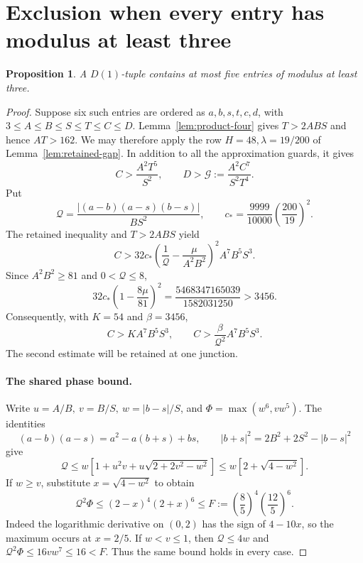 \documentclass[12pt]{article}
\newtheorem{proposition}[theorem]{Proposition}
\numberwithin{equation}{section}
\begin{document}
\section{Exclusion when every entry has modulus at least three}
\label{sec:all-large}

\begin{proposition}\label{prop:no-all-large-six}
A \(D(1)\)-tuple contains at most five entries of modulus at least three.
\end{proposition}
\begin{proof}
Suppose six such entries are ordered as \(a,b,s,t,c,d\), with
\(3\le A\le B\le S\le T\le C\le D\).
Lemma~\ref{lem:product-four} gives \(T>2ABS\) and hence \(AT>162\).
We may therefore apply the row \(H=48,\lambda=19/200\) of
Lemma~\ref{lem:retained-gap}. In addition to all the approximation guards,
it gives
\begin{equation}\label{eq:integrated-6}
C>\frac{A^2T^5}{S^2},\qquad
 D>\mathcal G:=\frac{A^2C^7}{S^2T^4}.
\end{equation}
Put
\[
 \mathcal Q=\frac{|(a-b)(a-s)(b-s)|}{BS^2},\qquad
 c_*=\frac{9999}{10000}\left(\frac{200}{19}\right)^2.
\]
The retained inequality and \(T>2ABS\) yield
\[
 C>32c_*\left(\frac1{\mathcal Q}-\frac{\mu}{A^2B^2}\right)^2
                         A^7B^5S^3.
\]
Since \(A^2B^2\ge81\) and \(0<\mathcal Q\le8\),
\[
 32c_*\left(1-\frac{8\mu}{81}\right)^2
 =\frac{5468347165039}{1582031250}>3456.
\]
Consequently, with \(K=54\) and \(\beta=3456\),
\begin{equation}\label{eq:large-gap}
 C>K A^7B^5S^3,\qquad
 C>\frac{\beta}{\mathcal Q^2}A^7B^5S^3.
\end{equation}
The second estimate will be retained at one junction.

\paragraph{The shared phase bound.}
Write \(u=A/B,\ v=B/S,\ w=|b-s|/S\), and
\(\Phi=\max(w^6,vw^5)\). The identities
\[
 (a-b)(a-s)=a^2-a(b+s)+bs,\qquad
 |b+s|^2=2B^2+2S^2-|b-s|^2
\]
give
\[
 \mathcal Q\le w[1+u^2v+u\sqrt{2+2v^2-w^2}]
 \le w[2+\sqrt{4-w^2}].
\]
If \(w\ge v\), substitute \(x=\sqrt{4-w^2}\) to obtain
\[
 \mathcal Q^2\Phi\le(2-x)^4(2+x)^6
 \le F:=\left(\frac85\right)^4\left(\frac{12}{5}\right)^6.
\]
Indeed the logarithmic derivative on \((0,2)\) has the sign of
\(4-10x\), so the maximum occurs at \(x=2/5\).
If \(w<v\le1\), then \(\mathcal Q\le4w\) and
\(\mathcal Q^2\Phi\le16vw^7\le16<F\).
Thus the same bound holds in every case.


\end{proof}
\end{document}
